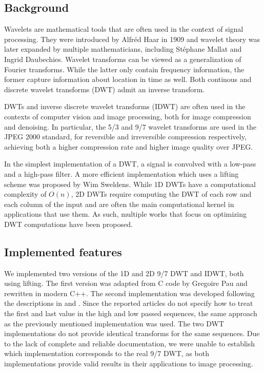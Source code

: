 \subsection{Background}
Wavelets are mathematical tools that are often used in the context of signal processing. They were introduced by Alfréd Haar in 1909\cite{haar} and wavelet theory was later expanded by multiple mathematicians, including Stéphane Mallat and Ingrid Daubechies. Wavelet transforms can be viewed as a generalization of Fourier transforms. While the latter only contain frequency information, the former capture information about location in time as well. Both continous and discrete wavelet transforms (DWT) admit an inverse transform.

DWTs and inverse discrete wavelet transforms (IDWT) are often used in the contexts of computer vision\cite{wavelet_application_4} and image processing\cite{wavelet_application_1}\cite{wavelet_application_2}, both for image compression and denoising\cite{wavelet_application_3}. In particular, the 5/3 and 9/7 wavelet transforms are used in the JPEG 2000 standard, for reversible and irreversible compression respectively, achieving both a higher compression rate and higher image quality over JPEG.

In the simplest implementation of a DWT, a signal is convolved with a low-pass and a high-pass filter. A more efficient implementation which uses a lifting scheme was proposed by Wim Sweldens\cite{lifting}. While 1D DWTs have a computational complexity of $O(n)$, 2D DWTs require computing the DWT of each row and each column of the input and are often the main computational kernel in applications that use them. As such, multiple works that focus on optimizing DWT computations have been proposed\cite{wavelet_fast_1}\cite{wavelet_fast_2}\cite{wavelet_fast_3}\cite{wavelet_fast_4}.

\subsection{Implemented features}
We implemented two versions of the 1D and 2D 9/7 DWT and IDWT, both using lifting. The first version was adapted from C code by Gregoire Pau\cite{gregoire_pau} and rewritten in modern C++. The second implementation was developed following the descriptions in \cite{Daubechies} and \cite{wavelet_fast_1}. Since the reported articles do not specify how to treat the first and last value in the high and low passed sequences, the same approach as the previously mentioned implementation was used. The two DWT implementations do not provide identical transforms for the same sequences. Due to the lack of complete and reliable documentation, we were unable to establish which implementation corresponds to the real 9/7 DWT, as both implementations provide valid results in their applications to image processing.

